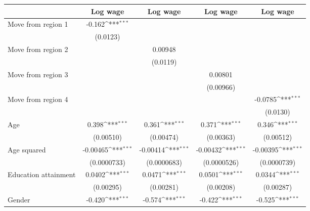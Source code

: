 {
\def\sym#1{\ifmmode^{#1}\else\(^{#1}\)\fi}
\begin{tabular*}{\textwidth}{@{\hskip\tabcolsep\extracolsep\fill}l*{4}{c}}
\toprule
                    &\multicolumn{1}{c}{Log wage}&\multicolumn{1}{c}{Log wage}&\multicolumn{1}{c}{Log wage}&\multicolumn{1}{c}{Log wage}\\
\midrule
Move from region 1  &      -0.162\sym{***}&                     &                     &                     \\
                    &    (0.0123)         &                     &                     &                     \\
\addlinespace
Move from region 2  &                     &     0.00948         &                     &                     \\
                    &                     &    (0.0119)         &                     &                     \\
\addlinespace
Move from region 3  &                     &                     &     0.00801         &                     \\
                    &                     &                     &   (0.00966)         &                     \\
\addlinespace
Move from region 4  &                     &                     &                     &     -0.0785\sym{***}\\
                    &                     &                     &                     &    (0.0130)         \\
\addlinespace
Age                 &       0.398\sym{***}&       0.361\sym{***}&       0.371\sym{***}&       0.346\sym{***}\\
                    &   (0.00510)         &   (0.00474)         &   (0.00363)         &   (0.00512)         \\
\addlinespace
Age squared         &    -0.00465\sym{***}&    -0.00414\sym{***}&    -0.00432\sym{***}&    -0.00395\sym{***}\\
                    & (0.0000733)         & (0.0000683)         & (0.0000526)         & (0.0000739)         \\
\addlinespace
Education attainment&      0.0402\sym{***}&      0.0471\sym{***}&      0.0501\sym{***}&      0.0344\sym{***}\\
                    &   (0.00295)         &   (0.00281)         &   (0.00208)         &   (0.00287)         \\
\addlinespace
Gender              &      -0.420\sym{***}&      -0.574\sym{***}&      -0.422\sym{***}&      -0.525\sym{***}\\

\end{tabular*}}
